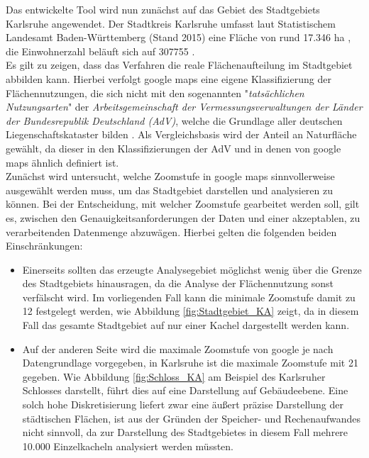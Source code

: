 \documentclass[12pt,a4paper]{scrartcl}
\begin{document}
Das entwickelte Tool wird nun zunächst auf das Gebiet des Stadtgebiets Karlsruhe angewendet. Der Stadtkreis Karlsruhe umfasst laut Statistischem Landesamt Baden-Württemberg (Stand 2015) eine Fläche von rund \num{17.346} \si{\hectare} \cite{StatBaWu_Flaeche}, die Einwohnerzahl beläuft sich auf \num{307755} \cite{StatBaWu_Einw}.\\
Es gilt zu zeigen, dass das Verfahren die reale Flächenaufteilung im Stadtgebiet abbilden kann. Hierbei verfolgt google maps eine eigene Klassifizierung der Flächennutzungen, die sich nicht mit den sogenannten "\textit{tatsächlichen Nutzungsarten}" der  \textit{Arbeitsgemeinschaft der Vermessungsverwaltungen der Länder der Bundesrepublik Deutschland (AdV)}, welche die Grundlage aller deutschen Liegenschaftskataster bilden \cite{advnutz} . Als Vergleichsbasis wird der Anteil an Naturfläche gewählt, da dieser in den Klassifizierungen der AdV und in denen von google maps ähnlich definiert ist.\\ 
\newline
Zunächst wird untersucht, welche Zoomstufe in google maps sinnvollerweise ausgewählt werden muss, um das Stadtgebiet darstellen und analysieren zu können. Bei der Entscheidung, mit welcher Zoomstufe gearbeitet werden soll, gilt es, zwischen den Genauigkeitsanforderungen  der Daten und einer akzeptablen, zu verarbeitenden Datenmenge abzuwägen. Hierbei gelten die folgenden beiden Einschränkungen:\\
\begin{itemize}
\item Einerseits sollten das erzeugte Analysegebiet möglichst wenig über die Grenze des Stadtgebiets hinausragen, da die Analyse der Flächennutzung sonst verfälscht wird. Im vorliegenden Fall kann die minimale Zoomstufe damit zu 12 festgelegt werden, wie Abbildung \ref{fig:Stadtgebiet_KA} zeigt, da in diesem Fall das gesamte Stadtgebiet auf nur einer Kachel dargestellt werden kann.
\item Auf der anderen Seite wird die maximale Zoomstufe von google je nach Datengrundlage vorgegeben, in Karlsruhe ist die maximale Zoomstufe mit 21 gegeben. Wie Abbildung \ref{fig:Schloss_KA} am Beispiel des Karlsruher Schlosses darstellt, führt dies auf eine Darstellung auf Gebäudeebene. Eine solch hohe Diskretisierung liefert zwar eine äußert präzise Darstellung der städtischen Flächen, ist aus der Gründen der Speicher- und Rechenaufwandes nicht sinnvoll, da zur Darstellung des Stadtgebietes in diesem Fall mehrere 10.000 Einzelkacheln analysiert werden müssten.
\end{itemize}
\end{document}
